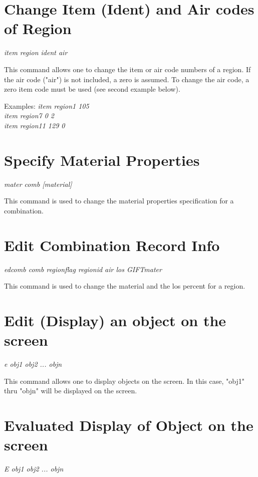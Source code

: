 \section{Change Item (Ident) and Air codes of Region}

{\em \center
item region ident air
}

This command allows one to change the item or
air code numbers of a region.  If the air code ("air") is not included,
a zero is assumed.
To change the air code, a zero item code must be used (see second
example below).

Examples:
{\em
            item region1 105 \\
            item region7 0 2 \\
            item region11 129 0 \\
}

\section{Specify Material Properties}

{\em \center
mater comb [material]
}

This command is used to change the material properties specification for
a combination.

\section{Edit Combination Record Info}

{\em \center
edcomb comb regionflag regionid air los GIFTmater
}

This command is used to change the material and the los percent for
a region.

\section{Edit (Display) an object on the screen}

{\em \center
e obj1 obj2 ... objn
}

This command allows one to display objects on the screen.
In this case, "obj1" thru "objn" will be displayed on the screen.

\section{Evaluated Display of Object on the screen}

{\em \center
E obj1 obj2 ... objn
}

